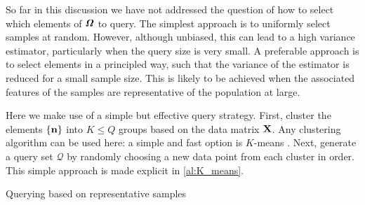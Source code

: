 \label{sec:query_strats}

So far in this discussion we have not addressed the question of how to select which elements of $\bm{\mathit{\Omega}}$ to query. The simplest approach is to uniformly select samples at random. However, although unbiased, this can lead to a high variance estimator, particularly when the query size is very small. A preferable approach is to select elements in a principled way, such that the variance of the estimator is reduced for a small sample size. This is likely to be achieved when the associated features of the samples are representative of the population at large. 

Here we make use of a simple but effective query strategy. First, cluster the elements $\{ \mathbf{n} \}$ into $K \leq Q$ groups based on the data matrix $\mathbf{X}$. Any clustering algorithm can be used here: a simple and fast option is $K$-means \citep{MacQueen1967, Hartigan1979}. Next, generate a query set $\mathcal{Q}$ by randomly choosing a new data point from each cluster in order. This simple approach is made explicit in \cref{al:K_means}. 

\vspace{0.5cm}

\begin{algorithm}[ht]
\begin{algorithmic}
\vspace{0.05cm}
\vspace{0.05cm}
\vspace{0.05cm}
\vspace{0.15cm}
\vspace{0.15cm}
\vspace{0.15cm}
\vspace{0.15cm}
\vspace{0.15cm}
\vspace{0.15cm}
\vspace{0.15cm}
\vspace{0.15cm}
\EndFor
\vspace{0.15cm}
\vspace{0.15cm}
\end{algorithmic}
\caption{Querying based on representative samples}
\label{al:K_means}
\end{algorithm}


